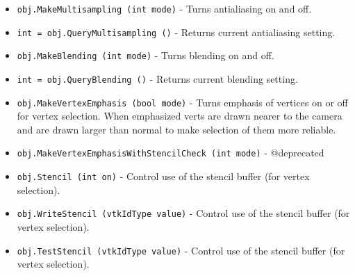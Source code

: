 \begin{itemize}
\item  \verb|obj.MakeMultisampling (int mode)| -  Turns antialiasing on and off.

\item  \verb|int = obj.QueryMultisampling ()| -  Returns current antialiasing setting.

\item  \verb|obj.MakeBlending (int mode)| -  Turns blending on and off.

\item  \verb|int = obj.QueryBlending ()| -  Returns current blending setting.

\item  \verb|obj.MakeVertexEmphasis (bool mode)| -  Turns emphasis of vertices on or off for vertex selection.
 When emphasized verts are drawn nearer to the camera and are drawn 
 larger than normal to make selection of them more reliable.

\item  \verb|obj.MakeVertexEmphasisWithStencilCheck (int mode)| -  @deprecated

\item  \verb|obj.Stencil (int on)| -  Control use of the stencil buffer (for vertex selection).

\item  \verb|obj.WriteStencil (vtkIdType value)| -  Control use of the stencil buffer (for vertex selection).

\item  \verb|obj.TestStencil (vtkIdType value)| -  Control use of the stencil buffer (for vertex selection).

\end{itemize}
